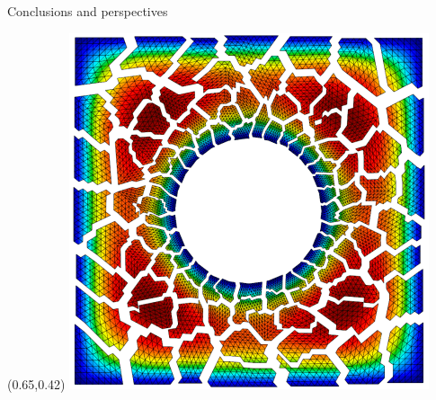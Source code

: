 \documentclass{beamer}
\begin{document}
\begin{frame}{Conclusions and perspectives}
{\begin{minipage}{1.1\textwidth}
\begin{itemize}
\begin{itemize}
    \end{itemize}
  \end{itemize}
    \end{minipage}}
  \begin{textblock}{.2}(0.65,0.42)
  \includegraphics[width=.94\textwidth]{img/ex1p-np100.png}
  \end{textblock}
\end{frame}    
\end{document}
